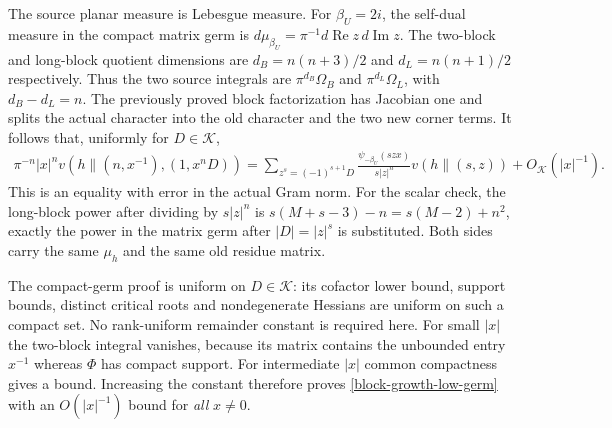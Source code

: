 The source planar measure is Lebesgue measure.  For
$\beta_U=2i$, the self-dual measure in the compact matrix germ is
$d\mu_{\beta_U}=\pi^{-1}d\operatorname{Re}z\,
d\operatorname{Im}z$.  The two-block and long-block quotient
dimensions are $d_B=n(n+3)/2$ and $d_L=n(n+1)/2$ respectively.
Thus the two source integrals are $\pi^{d_B}\Omega_B$ and
$\pi^{d_L}\Omega_L$, with $d_B-d_L=n$.  The previously proved
block factorization has Jacobian one and splits the actual
character into the old character and the two new corner terms.
It follows that, uniformly for $D\in\mathcal K$,
\begin{equation}\label{block-growth-low-germ}
 \begin{split}
 \pi^{-n}|x|^n
       v(h\mathbin{\|}(n,x^{-1}),(1,x^nD))
  =\sum_{z^s=(-1)^{s+1}D}
       \frac{\psi_{-\beta_U}(szx)}{s|z|^n}
                  v(h\mathbin{\|}(s,z))+O_{\mathcal K}(|x|^{-1}).
 \end{split}
\end{equation}
This is an equality with error in the actual Gram norm.
For the scalar check, the long-block power after dividing by
$s|z|^n$ is $s(M+s-3)-n=s(M-2)+n^2$, exactly the power in the
matrix germ after $|D|=|z|^s$ is substituted.  Both sides carry
the same $\mu_h$ and the same old residue matrix.

The compact-germ proof is uniform on $D\in\mathcal K$: its
cofactor lower bound, support bounds, distinct critical roots and
nondegenerate Hessians are uniform on such a compact set.
No rank-uniform remainder constant is required here.  For small
$|x|$ the two-block integral vanishes, because its matrix contains
the unbounded entry $x^{-1}$ whereas $\Phi$ has compact support.
For intermediate $|x|$ common compactness gives a bound.
Increasing the constant therefore proves
\eqref{block-growth-low-germ} with an $O(|x|^{-1})$ bound for
\emph{all} $x\ne0$.

